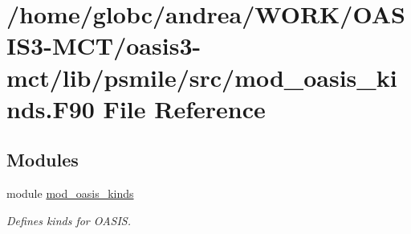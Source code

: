 \hypertarget{mod__oasis__kinds_8_f90}{}\section{/home/globc/andrea/\+W\+O\+R\+K/\+O\+A\+S\+I\+S3-\/\+M\+C\+T/oasis3-\/mct/lib/psmile/src/mod\+\_\+oasis\+\_\+kinds.F90 File Reference}
\label{mod__oasis__kinds_8_f90}
\subsection*{Modules}
\begin{DoxyCompactItemize}
\item 
module \hyperlink{namespacemod__oasis__kinds}{mod\+\_\+oasis\+\_\+kinds}
\begin{DoxyCompactList}\small\item\em Defines kinds for O\+A\+S\+IS. \end{DoxyCompactList}\end{DoxyCompactItemize}
